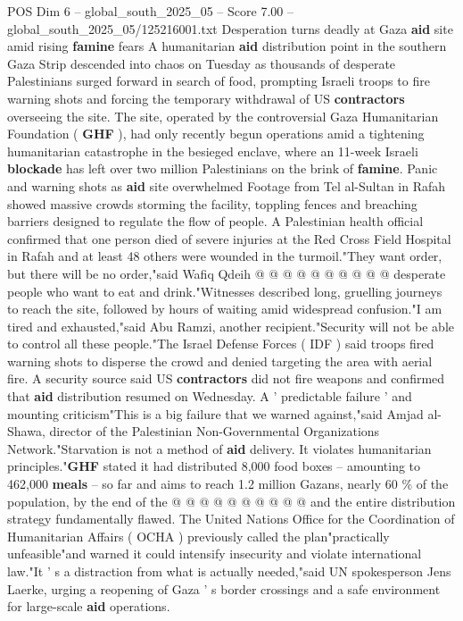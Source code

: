 \begin{textsample}{POS Dim 6 – global\_south\_2025\_05 – Score 7.00 – global\_south\_2025\_05/125216001.txt}  \label{ex:f6_pos_059}
Desperation turns deadly at Gaza \textbf{aid} site amid rising \textbf{famine} fears A humanitarian \textbf{aid} distribution point in the southern Gaza Strip descended into chaos on Tuesday as thousands of desperate Palestinians surged forward in search of food, prompting Israeli troops to fire warning shots and forcing the temporary withdrawal of US \textbf{contractors} overseeing the site.
The site, operated by the controversial Gaza Humanitarian Foundation ( \textbf{GHF} ), had only recently begun operations amid a tightening humanitarian catastrophe in the besieged enclave, where an 11-week Israeli \textbf{blockade} has left over two million Palestinians on the brink of \textbf{famine}.
Panic and warning shots as \textbf{aid} site overwhelmed Footage from Tel al-Sultan in Rafah showed massive crowds storming the facility, toppling fences and breaching barriers designed to regulate the flow of people.
A Palestinian health official confirmed that one person died of severe injuries at the Red Cross Field Hospital in Rafah and at least 48 others were wounded in the turmoil."They want order, but there will be no order,"said Wafiq Qdeih @ @ @ @ @ @ @ @ @ @ desperate people who want to eat and drink."Witnesses described long, gruelling journeys to reach the site, followed by hours of waiting amid widespread confusion."I am tired and exhausted,"said Abu Ramzi, another recipient."Security will not be able to control all these people."The Israel Defense Forces ( IDF ) said troops fired warning shots to disperse the crowd and denied targeting the area with aerial fire.
A security source said US \textbf{contractors} did not fire weapons and confirmed that \textbf{aid} distribution resumed on Wednesday.
A ' predictable failure ' and mounting criticism"This is a big failure that we warned against,"said Amjad al-Shawa, director of the Palestinian Non-Governmental Organizations Network."Starvation is not a method of \textbf{aid} delivery.
It violates humanitarian principles."\textbf{GHF} stated it had distributed 8,000 food boxes -- amounting to 462,000 \textbf{meals} -- so far and aims to reach 1.2 million Gazans, nearly 60 \% of the population, by the end of the @ @ @ @ @ @ @ @ @ @ and the entire distribution strategy fundamentally flawed.
The United Nations Office for the Coordination of Humanitarian Affairs ( OCHA ) previously called the plan"practically unfeasible"and warned it could intensify insecurity and violate international law."It ' s a distraction from what is actually needed,"said UN spokesperson Jens Laerke, urging a reopening of Gaza ' s border crossings and a safe environment for large-scale \textbf{aid} operations.

\end{textsample}
